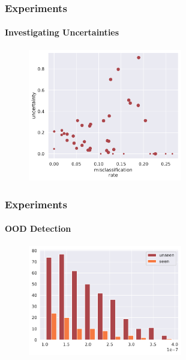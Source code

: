 \documentclass[9pt]{beamer}
\begin{document}
\begin{frame}
\frametitle{Experiments}
\framesubtitle{Investigating Uncertainties}
	\begin{figure}
		\centering
		\includegraphics[width=0.6\textwidth]{images/error_sigma_corr_all.pdf} 
	\end{figure}
\end{frame} 




\begin{frame}
\frametitle{Experiments}
\framesubtitle{OOD Detection}
\begin{figure}
	\centering
	\includegraphics[width=0.6\textwidth]{images/zero_shot_class_uncertainty_median_hist.pdf}
\end{figure}
\end{frame} 
\end{document}
